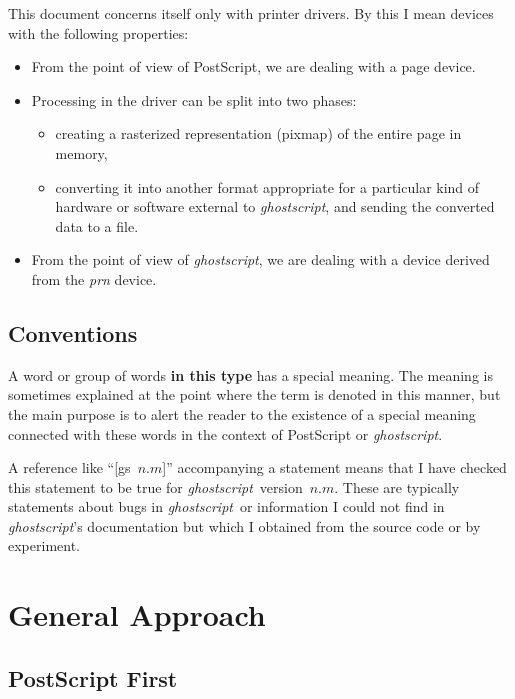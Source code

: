 \documentclass[twoside,a4paper]{article}
\newcommand{\gs}{\textit{ghostscript\/}}
\renewcommand{\d}[1]{{\bfseries #1}}	%
\begin{document}
This document concerns itself only with printer drivers.
By this I mean devices with the following properties:
\begin{itemize}
  \item From the point of view of PostScript, we are dealing with a page device.
  \item Processing in the driver can be split into two phases:
  \begin{itemize}
    \item creating a rasterized representation (pixmap) of the entire page in
      memory,
    \item converting it into another format appropriate for a particular kind
      of hardware or software external to \gs, and
      sending the converted data to a file.
  \end{itemize}
  \item From the point of view of \gs, we are dealing with a device derived
    from the {\it prn\/} device.
\end{itemize}


\subsection{Conventions}

A word or group of words \d{in this type} has a special meaning.
The meaning is sometimes explained at the point where the term is denoted in
this manner,
but the main purpose is to alert the reader to the existence of a special
meaning connected with these words in the context of PostScript or \gs.

A reference like ``[gs~$n.m$]'' accompanying a statement means that I have
checked this statement to be true for \gs\ version~$n.m$.
These are typically statements about bugs in \gs\ or
information I could not find in \gs's documentation
but which I obtained from the source code or by experiment.


\section{General Approach}


\subsection{PostScript First}
\end{document}
